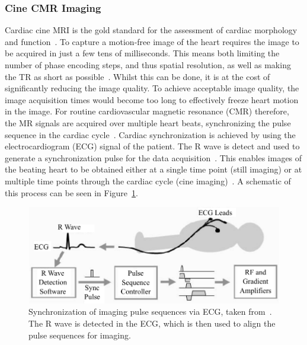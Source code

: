 \subsubsection{Cine CMR Imaging}
Cardiac cine MRI is the gold standard for the assessment of cardiac morphology and function~\cite{KuestnerCINE,Kramer2020}. To capture a motion-free image of the heart requires the image to be acquired in just a few tens of milliseconds. This means both limiting the number of phase encoding steps, and thus spatial resolution, as well as making the TR as short as possible~\cite{CineReview1,CineReview2}. Whilst this can be done, it is at the cost of significantly reducing the image quality. To achieve acceptable image quality, the image acquisition times would become too long to effectively freeze heart motion in the image. For routine cardiovascular magnetic resonance (CMR) therefore, the MR signals are acquired over multiple heart beats, synchronizing the pulse sequence in the cardiac cycle~\cite{Lin2022}. Cardiac synchronization is achieved by using the electrocardiogram (ECG) signal of the patient. The R wave is detect and used to generate a synchronization pulse for the data acquisition~\cite{Lanzer1985}. This enables images of the beating heart to be obtained either at a single time point (still imaging) or at multiple time points through the cardiac cycle (cine imaging)~\cite{CineReview1}. A schematic of this process can be seen in Figure~\ref{fig:CineWorkFlow}.

\begin{figure}[h] %
	\centering
	\includegraphics[width=\linewidth]{./Images/CineWorkFlow.pdf} 
	\caption{Synchronization of imaging pulse sequences via ECG, taken from~\cite{CineReview1}. The R wave is detected in the ECG, which is then used to align the pulse sequences for imaging.}
	\label{fig:CineWorkFlow}
\end{figure}

